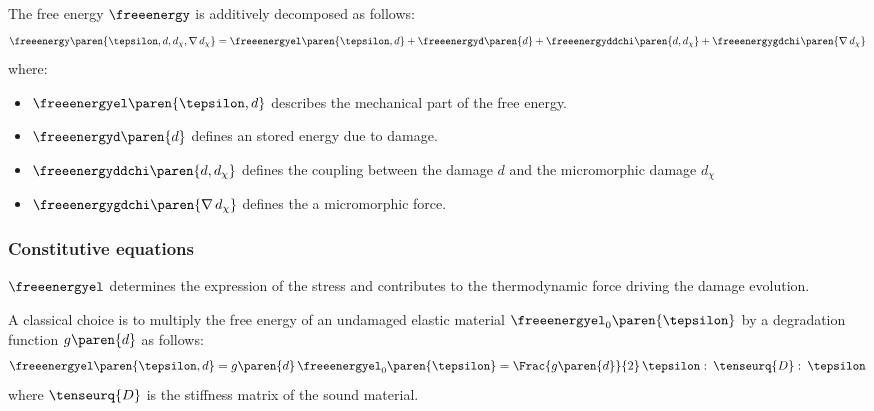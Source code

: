 The free energy $\freeenergy$ is additively decomposed as follows:
\begin{equation}
  \label{eq:ef_micromorphic:formulation:freeenergy_split}
  \freeenergy\paren{\tepsilon, d, d_{\chi}, \nabla\,d_{\chi}}=
  \freeenergyel\paren{\tepsilon, d}+
  \freeenergyd\paren{d}+
  \freeenergyddchi\paren{d, d_{\chi}}+
  \freeenergygdchi\paren{\nabla\,d_{\chi}}
\end{equation}
where:

\begin{itemize}
    \item $\freeenergyel\paren{\tepsilon, d}$ describes the mechanical part of
    the free energy.
    \item $\freeenergyd\paren{d}$ defines an stored energy due to damage.
    \item $\freeenergyddchi\paren{d, d_{\chi}}$ defines the coupling between
    the damage $d$ and the micromorphic damage $d_{\chi}$
    \item $\freeenergygdchi\paren{\nabla\, d_{\chi}}$ defines the a
    micromorphic force.
\end{itemize}

\subsubsection{Constitutive equations}

$\freeenergyel$ determines the expression of the stress and contributes
to the thermodynamic force driving the damage evolution.

A classical choice is to multiply the free energy of an undamaged
elastic material $\freeenergyel_{0}\paren{\tepsilon}$ by a degradation
function $g\paren{d}$ as follows:
\begin{equation}
  \label{eq:micromorphicdamage:freeenergygel}
  \freeenergyel\paren{\tepsilon, d} = 
  g\paren{d}\,\freeenergyel_{0}\paren{\tepsilon} = \Frac{g\paren{d}}{2}\,\tepsilon\,\colon\,\tenseurq{D}\,\colon\,\tepsilon
\end{equation}
where $\tenseurq{D}$ is the stiffness matrix of the sound material.


